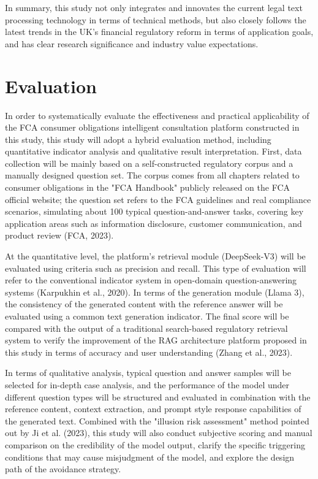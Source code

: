 \documentclass[a4paper,11pt]{article}
\begin{document}
In summary, this study not only integrates and innovates the current legal text processing technology in terms of technical methods, but also closely follows the latest trends in the UK's financial regulatory reform in terms of application goals, and has clear research significance and industry value expectations.

\section{Evaluation}

In order to systematically evaluate the effectiveness and practical applicability of the FCA consumer obligations intelligent consultation platform constructed in this study, this study will adopt a hybrid evaluation method, including quantitative indicator analysis and qualitative result interpretation. First, data collection will be mainly based on a self-constructed regulatory corpus and a manually designed question set. The corpus comes from all chapters related to consumer obligations in the "FCA Handbook" publicly released on the FCA official website; the question set refers to the FCA guidelines and real compliance scenarios, simulating about 100 typical question-and-answer tasks, covering key application areas such as information disclosure, customer communication, and product review (FCA, 2023).

At the quantitative level, the platform's retrieval module (DeepSeek-V3) will be evaluated using criteria such as precision and recall. This type of evaluation will refer to the conventional indicator system in open-domain question-answering systems (Karpukhin et al., 2020). In terms of the generation module (Llama 3), the consistency of the generated content with the reference answer will be evaluated using a common text generation indicator. The final score will be compared with the output of a traditional search-based regulatory retrieval system to verify the improvement of the RAG architecture platform proposed in this study in terms of accuracy and user understanding (Zhang et al., 2023).

In terms of qualitative analysis, typical question and answer samples will be selected for in-depth case analysis, and the performance of the model under different question types will be structured and evaluated in combination with the reference content, context extraction, and prompt style response capabilities of the generated text. Combined with the "illusion risk assessment" method pointed out by Ji et al. (2023), this study will also conduct subjective scoring and manual comparison on the credibility of the model output, clarify the specific triggering conditions that may cause misjudgment of the model, and explore the design path of the avoidance strategy.
\end{document}

